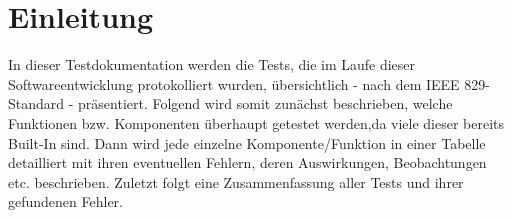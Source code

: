 

\chapter{Einleitung}
%

In dieser Testdokumentation werden die Tests, die im Laufe dieser 
Softwareentwicklung protokolliert wurden, übersichtlich - nach dem IEEE 829-Standard
- präsentiert. Folgend wird somit zunächst beschrieben, welche Funktionen bzw. Komponenten
überhaupt getestet werden,da viele dieser bereits Built-In sind.
Dann wird jede einzelne Komponente/Funktion in einer Tabelle detailliert mit ihren 
eventuellen Fehlern, deren Auswirkungen, Beobachtungen etc. beschrieben.
Zuletzt folgt eine Zusammenfassung aller Tests und ihrer gefundenen Fehler.
